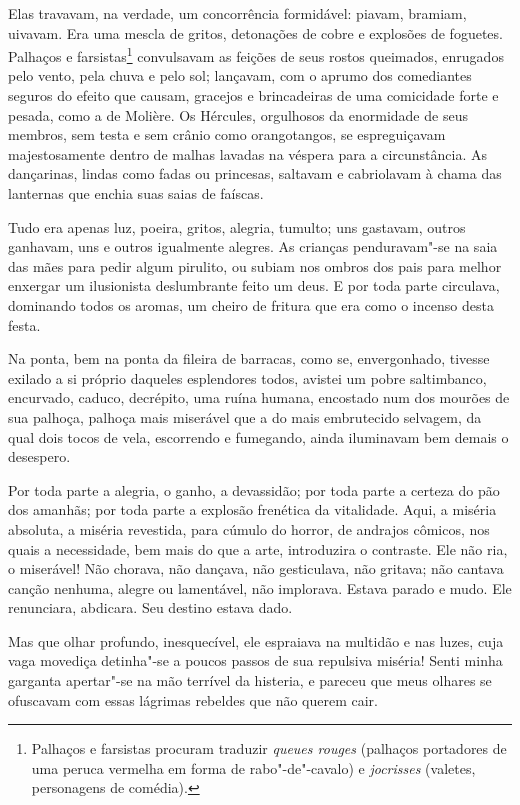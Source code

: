 Elas travavam, na verdade, um concorrência formidável: piavam, bramiam,
uivavam. Era uma mescla de gritos, detonações de cobre e explosões de
foguetes. Palhaços e farsistas\footnote{ Palhaços e farsistas procuram 
traduzir \textit{queues rouges} (palhaços
portadores de uma peruca vermelha em forma de rabo"-de"-cavalo) e
\textit{jocrisses} (valetes, personagens de comédia).} convulsavam as feições
de seus rostos queimados, enrugados pelo vento, pela chuva e pelo sol;
lançavam, com o aprumo dos comediantes seguros do efeito que causam,
gracejos e brincadeiras de uma comicidade forte e pesada, como a de
Molière. Os Hércules, orgulhosos da enormidade de seus membros, sem
testa e sem crânio como orangotangos, se espreguiçavam
majestosamente dentro de malhas lavadas na véspera para a circunstância. As
dançarinas, lindas como fadas ou princesas, saltavam e cabriolavam à
chama das lanternas que enchia suas saias de faíscas.

Tudo era apenas luz, poeira, gritos, alegria, tumulto; uns gastavam,
outros ganhavam, uns e outros igualmente alegres. As crianças
penduravam"-se na saia das mães para pedir algum pirulito, ou
subiam nos ombros dos pais para melhor enxergar um ilusionista
deslumbrante feito um deus. E por toda parte circulava, dominando todos
os aromas, um cheiro de fritura que era como o incenso desta festa.

Na ponta, bem na ponta da fileira de barracas, como se,
envergonhado, tivesse exilado a si próprio daqueles esplendores todos,
avistei um pobre saltimbanco, encurvado, caduco, decrépito, uma
ruína humana, encostado num dos mourões de sua palhoça, palhoça
mais miserável que a do mais embrutecido selvagem, da qual dois tocos
de vela, escorrendo e fumegando, ainda iluminavam bem demais o
desespero.

Por toda parte a alegria, o ganho, a devassidão; por toda parte a
certeza do pão dos amanhãs; por toda parte a explosão frenética da
vitalidade. Aqui, a miséria absoluta, a miséria revestida, para cúmulo
do horror, de andrajos cômicos, nos quais a necessidade, bem mais do
que a arte, introduzira o contraste. Ele não ria, o miserável! Não
chorava, não dançava, não gesticulava, não gritava; não cantava canção nenhuma, alegre ou lamentável, não implorava. Estava parado e
mudo. Ele renunciara, abdicara. Seu destino estava
dado.

Mas que olhar profundo, inesquecível, ele espraiava na multidão e
nas luzes, cuja vaga movediça detinha"-se a poucos passos de sua repulsiva
miséria! Senti minha garganta apertar"-se na mão terrível da histeria,
e pareceu que meus olhares se ofuscavam com essas lágrimas
rebeldes que não querem cair.


